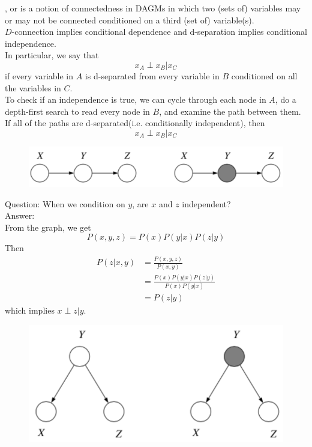\documentclass[11pt]{article}
\begin{document}
, or  is a notion of connectedness in DAGMs in which two (sets of) variables may or may not be connected conditioned on a third (set of) variable(s). \\
$D$-connection implies conditional dependence and d-separation implies conditional independence. \\
In particular, we say that
$$x_A \perp x_B | x_C$$
if every variable in $A$ is d-separated from every variable in $B$ conditioned on all the variables in $C$.\\
To check if an independence is true, we can cycle through each node in $A$, do a depth-first search to read every node in $B$, and examine the path between them. If all of the paths are d-separated(i.e. conditionally independent), then
$$x_A \perp x_B | x_C$$
 \begin{figure}[H]
	\centering
	\includegraphics[scale=0.3]{p3.png}
\end{figure}
\noindent Question: When we condition on $y$, are $x$ and $z$ independent? \\
Answer: \\
From the graph, we get
$$P(x,y,z) = P(x)P(y|x)P(z|y)$$
Then
\begin{align*}
	P(z|x,y) &= \frac{P(x,y,z)}{P(x,y)} \\
	&= \frac{P(x)P(y|x)P(z|y)}{P(x)P(y|x)} \\
	&= P(z|y)
\end{align*}
which implies $x \perp z|y$. 
 \begin{figure}[H]
	\centering
	\includegraphics[scale=0.3]{p4.png}
\end{figure}
\end{document}

